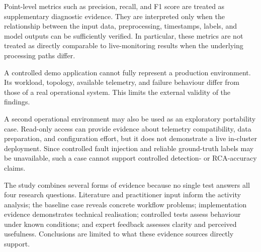 Point-level metrics such as precision, recall, and F1 score are treated as supplementary diagnostic evidence. They are interpreted only when the relationship between the input data, preprocessing, timestamps, labels, and model outputs can be sufficiently verified. In particular, these metrics are not treated as directly comparable to live-monitoring results when the underlying processing paths differ.

A controlled demo application cannot fully represent a production environment. Its workload, topology, available telemetry, and failure behaviour differ from those of a real operational system. This limits the external validity of the findings.

A second operational environment may also be used as an exploratory portability case. Read-only access can provide evidence about telemetry compatibility, data preparation, and configuration effort, but it does not demonstrate a live in-cluster deployment. Since controlled fault injection and reliable ground-truth labels may be unavailable, such a case cannot support controlled detection- or RCA-accuracy claims.

The study combines several forms of evidence because no single test answers all four research questions. Literature and practitioner input inform the activity analysis; the baseline case reveals concrete workflow problems; implementation evidence demonstrates technical realisation; controlled tests assess behaviour under known conditions; and expert feedback assesses clarity and perceived usefulness. Conclusions are limited to what these evidence sources directly support.













